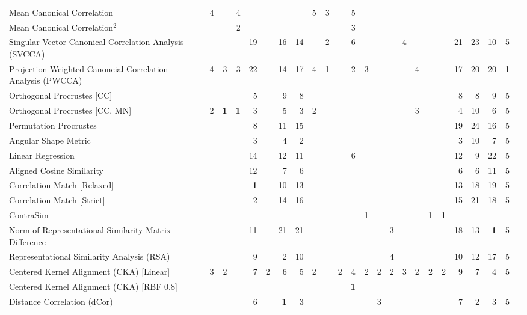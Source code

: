 \begin{table}
{{\begin{tabular}{l|r|r|r|r|r|r|r|r||r|r|r|r|r|r|r|r|r|r|r|r|r|r|r}
\midrule
\rowcolor{Gray}Mean Canonical Correlation & 4 & & 4 & & & & & 5 & 3 & & 5 & & & & & & & & & & & \\
Mean Canonical Correlation$^2$ & & & 2 & & & & & & & & 3 & & & & & & & & & & & \\
\rowcolor{Gray}Singular Vector Canonical Correlation Analysis (SVCCA) & & & & 19 & & 16 & 14 & & 2 & & 6 & & & & 4 & & & & 21 & 23 & 10 & 5 \\
Projection-Weighted Canoncial Correlation Analysis (PWCCA) & 4 & 3 & 3 & 22 & & 14 & 17 & 4 & \textbf{1} & & 2 & 3 & & & & 4 & & & 17 & 20 & 20 & \textbf{1} \\
\rowcolor{Gray}Orthogonal Procrustes [CC] & & & & 5 & & 9 & 8 & & & & & & & & & & & & 8 & 8 & 9 & 5 \\
Orthogonal Procrustes [CC, MN] & 2 & \textbf{1} & \textbf{1} & 3 & & 5 & 3 & 2 & & & & & & & & 3 & & & 4 & 10 & 6 & 5 \\
\rowcolor{Gray}Permutation Procrustes & & & & 8 & & 11 & 15 & & & & & & & & & & & & 19 & 24 & 16 & 5 \\
Angular Shape Metric & & & & 3 & & 4 & 2 & & & & & & & & & & & & 3 & 10 & 7 & 5 \\
\rowcolor{Gray}Linear Regression & & & & 14 & & 12 & 11 & & & & 6 & & & & & & & & 12 & 9 & 22 & 5 \\
Aligned Cosine Similarity & & & & 12 & & 7 & 6 & & & & & & & & & & & & 6 & 6 & 11 & 5 \\
\rowcolor{Gray}Correlation Match [Relaxed] & & & & \textbf{1} & & 10 & 13 & & & & & & & & & & & & 13 & 18 & 19 & 5 \\
Correlation Match [Strict] & & & & 2 & & 14 & 16 & & & & & & & & & & & & 15 & 21 & 18 & 5 \\
\rowcolor{Gray}ContraSim & & & & & & & & & & & & \textbf{1} & & & & & \textbf{1} & \textbf{1} & & & & \\
Norm of Representational Similarity Matrix Difference & & & & 11 & & 21 & 21 & & & & & & & 3 & & & & & 18 & 13 & \textbf{1} & 5 \\
\rowcolor{Gray}Representational Similarity Analysis (RSA) & & & & 9 & & 2 & 10 & & & & & & & 4 & & & & & 10 & 12 & 17 & 5 \\
Centered Kernel Alignment (CKA) [Linear] & 3 & 2 & & 7 & 2 & 6 & 5 & 2 & & 2 & 4 & 2 & 2 & 2 & 3 & 2 & 2 & 2 & 9 & 7 & 4 & 5 \\
\rowcolor{Gray}Centered Kernel Alignment (CKA) [RBF 0.8] & & & & & & & & & & & \textbf{1} & & & & & & & & & & & \\
Distance Correlation (dCor) & & & & 6 & & \textbf{1} & 3 & & & & & & 3 & & & & & & 7 & 2 & 3 & 5 \\

\end{tabular}}}
\end{table}
